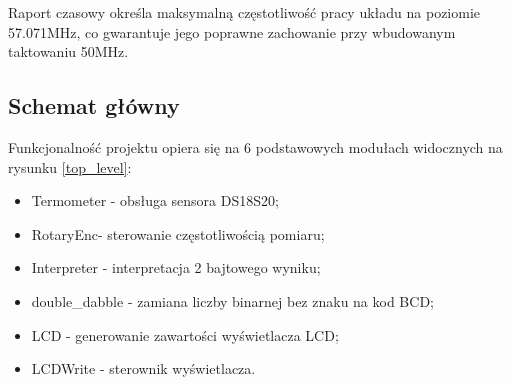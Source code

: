 \documentclass[a4paper]{article}
\begin{document}
Raport czasowy określa maksymalną częstotliwość pracy układu na poziomie 57.071MHz, co gwarantuje jego poprawne zachowanie przy wbudowanym taktowaniu 50MHz.

\subsection{Schemat główny}

Funkcjonalność projektu opiera się na 6 podstawowych modułach widocznych na rysunku \ref{top_level}:
\begin{itemize}
\item Termometer - obsługa sensora DS18S20;
\item RotaryEnc- sterowanie częstotliwością pomiaru;
\item Interpreter - interpretacja 2 bajtowego wyniku;
\item double\_dabble - zamiana liczby binarnej bez znaku na kod BCD;
\item LCD - generowanie zawartości wyświetlacza LCD;
\item LCDWrite - sterownik wyświetlacza.
\end{itemize}
\end{document}
